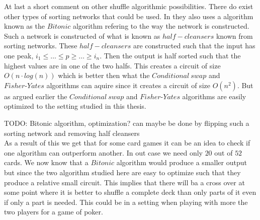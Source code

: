 \documentclass[twoside,11pt,openright]{report}
\newcommand{\todo}[1]{}
\renewcommand{\todo}[1]{{\color{red} TODO: {#1}} \\}
\begin{document}
At last a short comment on other shuffle algorithmic possibilities. There do exist other types of sorting networks that could be used. In  they also uses a algorithm known as the $Bitonic$ algorithm refering to the way the network is constructed. Such a network is constructed of what is known as $half-cleansers$ known from sorting networks. These $half-cleansers$ are constructed such that the input has one peak, $i_1\leq \dots \leq p \geq \dots \geq i_n$. Then the output is half sorted such that the highest values are in one of the two halfs. This creates a circuit of size $O(n\cdot log(n))$ which is better then what the $Conditional~swap$ and $Fisher\text{-}Yates$ algorithms can aquire since it creates a circuit of size $O(n^2)$. But as argued earlier the $Conditional~swap$ and $Fisher\text{-}Yates$ algorithms are easily optimized to the setting studied in this thesis.

\todo{Bitonic algorithm, optimization? can maybe be done by flipping such a sorting network and removing half cleansers}

As a result of this we get that for some card games it can be an idea to check if one algorithm can outperform another. In out case we need only $20$ out of $52$ cards. We now know that a $Bitonic$ algorithm would produce a smaller output but since the two algorithm studied here are easy to optimize such that they produce a relative small circuit. This implies that there will ba a cross over at some point where it is better to shuffle a complete deck than only parts of it even if only a part is needed. This could be in a setting when playing with more the two players for a game of poker.

\begin{table}
\label{circuit_gate_types}
\centering
{}
\caption{Compariason of the two implemented algorithms after compilation to $DUPLO$ circuits.}
\end{table}
\end{document}
